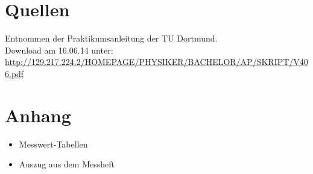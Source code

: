 \documentclass[11pt,ngerman,a4paper]{article}
\begin{document}
\section{Quellen}
\begin{enumerate}[{[}1{]}]
\item Entnommen der Praktikumsanleitung \textit{} der TU Dortmund. \\
Download am 16.06.14 unter:\\
 \url{http://129.217.224.2/HOMEPAGE/PHYSIKER/BACHELOR/AP/SKRIPT/V406.pdf}
\end{enumerate}
\section{Anhang}
\begin{itemize}
\item Messwert-Tabellen
\item Auszug aus dem Messheft
\end{itemize}
\newpage
\end{document}
